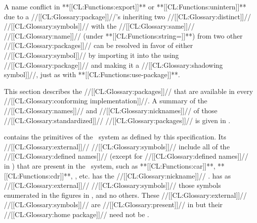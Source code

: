 \itemitem{--}  A name conflict in **[[CL:Functions:export]]** or **[[CL:Functions:unintern]]**  due to a //[[CL:Glossary:package]]//'s inheriting two //[[CL:Glossary:distinct]]// //[[CL:Glossary:symbols]]//  with the //[[CL:Glossary:same]]// //[[CL:Glossary:name]]// (under **[[CL:Functions:string=]]**) from two other //[[CL:Glossary:packages]]// can be resolved in favor of either //[[CL:Glossary:symbol]]// by importing it into the using //[[CL:Glossary:package]]// and making it a //[[CL:Glossary:shadowing symbol]]//, just as with **[[CL:Functions:use-package]]**. \endlist

\endsubsubsubsection%

\endsubsubsection%

\endsubSection%


This section describes the //[[CL:Glossary:packages]]// that are available in every //[[CL:Glossary:conforming implementation]]//.  A summary of the //[[CL:Glossary:names]]// and //[[CL:Glossary:nicknames]]// of those //[[CL:Glossary:standardized]]// //[[CL:Glossary:packages]]//  is given in \thenextfigure.




  

   contains the primitives of the \clisp\ system as defined by this specification.  Its //[[CL:Glossary:external]]// //[[CL:Glossary:symbols]]// include all of the //[[CL:Glossary:defined names]]// (except for //[[CL:Glossary:defined names]]// in ) that are present in the \clisp\ system,  such as **[[CL:Functions:car]]**, **[[CL:Functions:cdr]]**,  , etc.  has the //[[CL:Glossary:nickname]]// .
    has as //[[CL:Glossary:external]]// //[[CL:Glossary:symbols]]// those  symbols enumerated in the figures in \secref\CLsymbols, and no others. These //[[CL:Glossary:external]]// //[[CL:Glossary:symbols]]// are //[[CL:Glossary:present]]// in  but their //[[CL:Glossary:home package]]// need not be .

